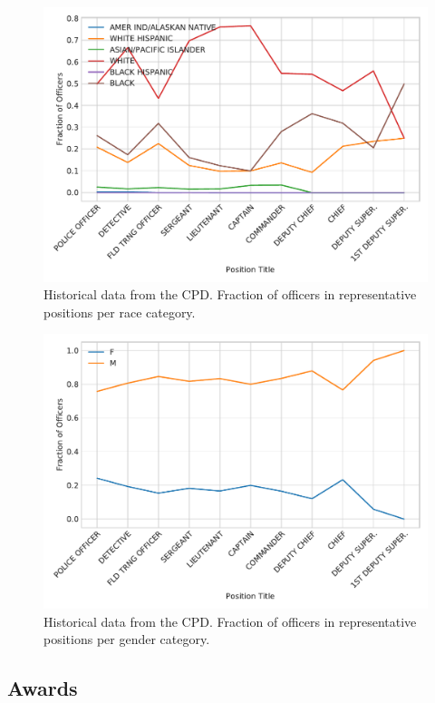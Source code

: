 \begin{figure}[h] 
\includegraphics[width=\textwidth]{figs/position_race} 
\caption{Historical data from the CPD. Fraction of officers in representative positions 
per race category.} \label{fig:salary}
\end{figure}

\begin{figure}[h] 
\includegraphics[width=\textwidth]{figs/position_gender} 
\caption{Historical data from the CPD. Fraction of officers in representative positions 
per gender category.} \label{fig:salary}
\end{figure}

\subsection{Awards}

